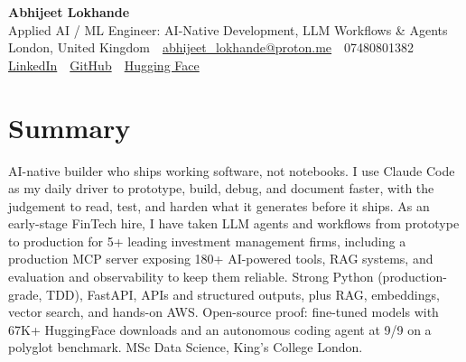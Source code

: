 \documentclass[10pt,a4paper]{article}
\newcommand{\sep}{\,\textcolor{accent!60}{\textbar}\,}
\begin{document}
\begin{center}
  {\fontsize{24}{26}\selectfont\bfseries Abhijeet Lokhande}\\[3pt]
  {\color{accent}\large Applied AI / ML Engineer: AI-Native Development, LLM Workflows \& Agents}\\[5pt]
  {\small
    London, United Kingdom \sep
    \href{mailto:abhijeet_lokhande@proton.me}{abhijeet\_lokhande@proton.me} \sep
    07480801382 \\[2pt]
    \href{https://www.linkedin.com/in/ablds/}{LinkedIn} \sep
    \href{https://github.com/abhijeetscode}{GitHub} \sep
    \href{https://huggingface.co/ab-ai}{Hugging Face}
  }
\end{center}
\vspace{2pt}

\section{Summary}
AI-native builder who ships working software, not notebooks. I use Claude Code as my daily driver to prototype, build, debug, and document faster, with the judgement to read, test, and harden what it generates before it ships. As an early-stage FinTech hire, I have taken LLM agents and workflows from prototype to production for 5+ leading investment management firms, including a production MCP server exposing 180+ AI-powered tools, RAG systems, and evaluation and observability to keep them reliable. Strong Python (production-grade, TDD), FastAPI, APIs and structured outputs, plus RAG, embeddings, vector search, and hands-on AWS. Open-source proof: fine-tuned models with 67K+ HuggingFace downloads and an autonomous coding agent at 9/9 on a polyglot benchmark. MSc Data Science, King's College London.

\end{document}
